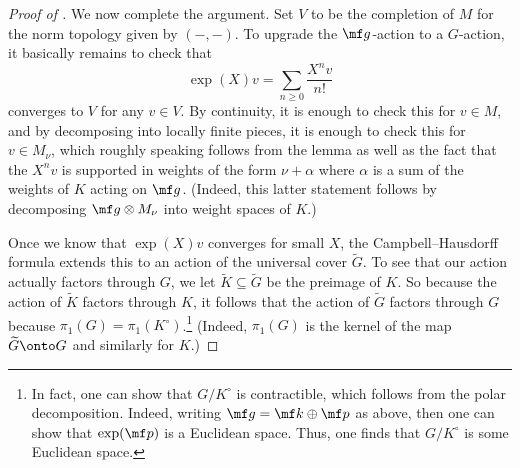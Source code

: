 \documentclass[../notes.tex]{subfiles}
\begin{document}
\begin{proof}[Proof of ]
	We now complete the argument. Set $V$ to be the completion of $M$ for the norm topology given by $(-,-)$. To upgrade the $\mf g$-action to a $G$-action, it basically remains to check that
	\[\exp(X)v=\sum_{n\ge0}\frac{X^nv}{n!}\]
	converges to $V$ for any $v\in V$. By continuity, it is enough to check this for $v\in M$, and by decomposing into locally finite pieces, it is enough to check this for $v\in M_\nu$, which roughly speaking follows from the lemma as well as the fact that the $X^nv$ is supported in weights of the form $\nu+\alpha$ where $\alpha$ is a sum of the weights of $K$ acting on $\mf g$. (Indeed, this latter statement follows by decomposing $\mf g\otimes M_\nu$ into weight spaces of $K$.)

	Once we know that $\exp(X)v$ converges for small $X$, the Campbell--Hausdorff formula extends this to an action of the universal cover $\widetilde G$. To see that our action actually factors through $G$, we let $\widetilde K\subseteq\widetilde G$ be the preimage of $K$. So because the action of $\widetilde K$ factors through $K$, it follows that the action of $\widetilde G$ factors through $G$ because $\pi_1(G)=\pi_1(K^\circ)$.\footnote{In fact, one can show that $G/K^\circ$ is contractible, which follows from the polar decomposition. Indeed, writing $\mf g=\mf k\oplus\mf p$ as above, then one can show that $\exp(\mf p)$ is a Euclidean space. Thus, one finds that $G/K^\circ$ is some Euclidean space.} (Indeed, $\pi_1(G)$ is the kernel of the map $\widetilde G\onto G$ and similarly for $K$.)
\end{proof}
\end{document}
